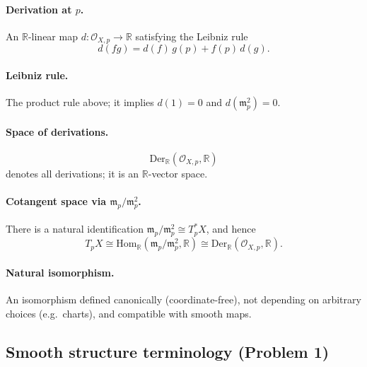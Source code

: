 \documentclass[12pt,a4paper]{article}
\theoremstyle{plain}
\theoremstyle{definition}      %
\begin{document}
\paragraph{\textbf{Derivation at $p$.}}
An $\mathbb{R}$-linear map $d:\mathcal{O}_{X,p}\to\mathbb{R}$ satisfying the Leibniz rule
\[
d(fg)=d(f)\,g(p)+f(p)\,d(g).
\]

\paragraph{\textbf{Leibniz rule.}}
The product rule above; it implies $d(1)=0$ and $d(\mathfrak{m}_p^2)=0$.

\paragraph{\textbf{Space of derivations.}}
\[
\mathrm{Der}_{\mathbb{R}}(\mathcal{O}_{X,p},\mathbb{R})
\]
denotes all derivations; it is an $\mathbb{R}$-vector space.

\paragraph{\textbf{Cotangent space via $\mathfrak{m}_p/\mathfrak{m}_p^2$.}}
There is a natural identification $\mathfrak{m}_p/\mathfrak{m}_p^2 \cong T_p^*X$, and hence
\[
T_pX \cong \mathrm{Hom}_{\mathbb{R}}(\mathfrak{m}_p/\mathfrak{m}_p^2,\mathbb{R})
\cong \mathrm{Der}_{\mathbb{R}}(\mathcal{O}_{X,p},\mathbb{R}).
\]

\paragraph{\textbf{Natural isomorphism.}}
An isomorphism defined canonically (coordinate-free), not depending on arbitrary choices (e.g.\ charts),
and compatible with smooth maps.

\subsection*{Smooth structure terminology (Problem 1)}
\end{document}

